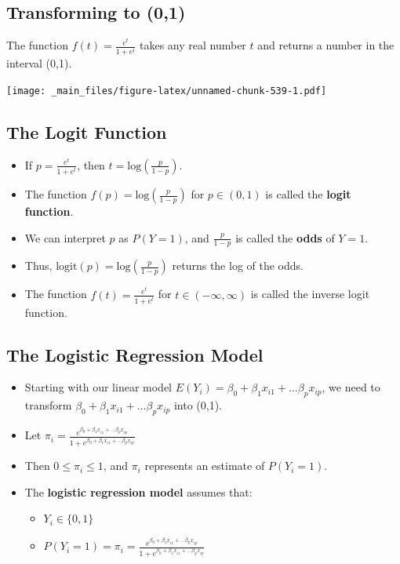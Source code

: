 \documentclass[]{book}
\providecommand{\tightlist}{%
  \setlength{\itemsep}{0pt}\setlength{\parskip}{0pt}}
\begin{document}
\subsection{Transforming to (0,1)}\label{transforming-to-01}

The function \(f(t)=\frac{e^t}{1+e^{t}}\) takes any real number \(t\)
and returns a number in the interval (0,1).

\texttt{[image: \_main\_files/figure-latex/unnamed-chunk-539-1.pdf]}

\subsection{The Logit Function}\label{the-logit-function}

\begin{itemize}
\item
  If \(p=\frac{e^t}{1+e^t}\), then
  \(t=\text{log}\left(\frac{p}{1-p} \right)\).
\item
  The function \(f(p) = \text{log}\left(\frac{p}{1-p} \right)\) for
  \(p \in (0,1)\) is called the \textbf{logit function}.
\item
  We can interpret \(p\) as \(P(Y=1)\), and \(\frac{p}{1-p}\) is called
  the \textbf{odds} of \(Y=1\).
\item
  Thus, \(\text{logit}(p) = \text{log}\left(\frac{p}{1-p} \right)\)
  returns the log of the odds.
\item
  The function \(f(t)=\frac{e^t}{1+e^t}\) for
  \(t \in (-\infty, \infty)\) is called the inverse logit function.
\end{itemize}

\subsection{The Logistic Regression
Model}\label{the-logistic-regression-model}

\begin{itemize}
\item
  Starting with our linear model
  \(E(Y_i) = \beta_0+\beta_1x_{i1} + \ldots \beta_px_{ip}\), we need to
  transform \(\beta_0+\beta_1x_{i1} + \ldots \beta_px_{ip}\) into (0,1).
\item
  Let
  \(\pi_i = \frac{e^{\beta_0+\beta_1x_{i1} + \ldots \beta_px_{ip}}}{1+e^{\beta_0+\beta_1x_{i1} + \ldots \beta_px_{ip}}}\)
\item
  Then \(0 \leq \pi_i \leq 1\), and \(\pi_i\) represents an estimate of
  \(P(Y_i=1)\).
\item
  The \textbf{logistic regression model} assumes that:

  \begin{itemize}
  \tightlist
  \item
    \(Y_i \in \{0,1\}\)\\
  \item
    \(P(Y_i=1) = \pi_i=\frac{e^{\beta_0+\beta_1x_{i1} + \ldots \beta_px_{ip}}}{1+e^{\beta_0+\beta_1x_{i1} + \ldots \beta_px_{ip}}}\)
  \end{itemize}
\end{itemize}
\end{document}
